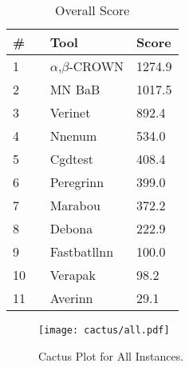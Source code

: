 

\begin{table}[h]
\begin{center}
\caption{Overall Score} \label{tab:score}
{\setlength{\tabcolsep}{2pt}
\begin{tabular}[h]{@{}lll@{}}
\toprule
\textbf{\# ~} & \textbf{Tool} & \textbf{Score}\\
\midrule
1 & $\alpha$,$\beta$-CROWN & 1274.9 \\
2 & MN BaB & 1017.5 \\
3 & Verinet & 892.4 \\
4 & Nnenum & 534.0 \\
5 & Cgdtest & 408.4 \\
6 & Peregrinn & 399.0 \\
7 & Marabou & 372.2 \\
8 & Debona & 222.9 \\
9 & Fastbatllnn & 100.0 \\
10 & Verapak & 98.2 \\
11 & Averinn & 29.1 \\
\bottomrule
\end{tabular}
}
\end{center}
\end{table}



\begin{figure}[h]
\centerline{\texttt{[image: cactus/all.pdf]}}
\caption{Cactus Plot for All Instances.}
\label{fig:quantPic}
\end{figure}

